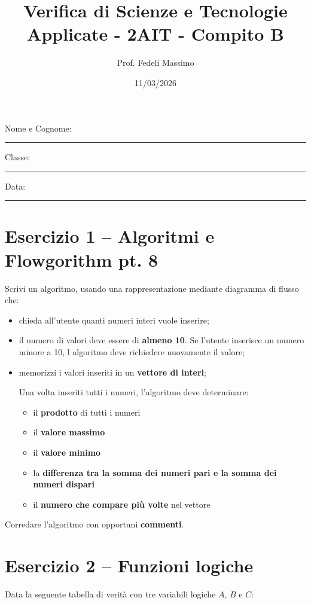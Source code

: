 \documentclass[a4paper,12pt]{article}
\title{Verifica di Scienze e Tecnologie Applicate  - 2AIT - Compito B}
\author{Prof. Fedeli Massimo}
\date{11/03/2026}
\begin{document}
	
	\maketitle
	
	Nome e Cognome: \rule{8cm}{0.4pt}
	
	Classe: \rule{3cm}{0.4pt} \hfill Data: \rule{3cm}{0.4pt}
	
	\vspace{1cm}
	
	\section*{Esercizio 1 – Algoritmi e Flowgorithm pt. 8}
	
	Scrivi un algoritmo, usando una rappresentazione mediante diagramma di flusso che:
	
		\begin{itemize}
		\item chieda all'utente quanti numeri interi vuole inserire;
		\item il numero di valori deve essere di \textbf{almeno 10}. Se l'utente inserisce un numero minore a 10, l algoritmo deve richiedere nuovamente il valore;
		\item memorizzi i valori inseriti in un \textbf{vettore di interi};
	
	Una volta inseriti tutti i numeri, l'algoritmo deve determinare:
	
	\begin{itemize}
		\item il \textbf{prodotto} di tutti i numeri
		\item il \textbf{valore massimo}
		\item il \textbf{valore minimo}
		\item la \textbf{differenza tra la somma dei numeri pari e la somma dei numeri dispari}
		\item il \textbf{numero che compare più volte} nel vettore
	\end{itemize}
		\end{itemize}
	Corredare l'algoritmo con opportuni \textbf{commenti}.
	
	\vspace{1cm}
	
	\section*{Esercizio 2 – Funzioni logiche}
	
	Data la seguente tabella di verità con tre variabili logiche \(A\), \(B\) e \(C\):
	
\end{document}
